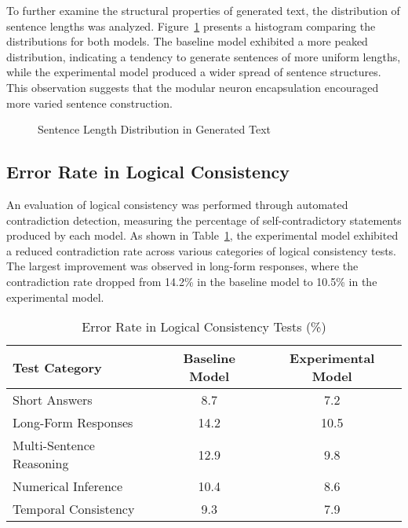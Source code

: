 \documentclass{article}
\begin{document}
To further examine the structural properties of generated text, the distribution of sentence lengths was analyzed. Figure~\ref{fig:sentence_length} presents a histogram comparing the distributions for both models. The baseline model exhibited a more peaked distribution, indicating a tendency to generate sentences of more uniform lengths, while the experimental model produced a wider spread of sentence structures. This observation suggests that the modular neuron encapsulation encouraged more varied sentence construction.

\begin{figure}[h]
	\centering
	\caption{Sentence Length Distribution in Generated Text}
	\label{fig:sentence_length}
\end{figure}

\subsection{Error Rate in Logical Consistency}

An evaluation of logical consistency was performed through automated contradiction detection, measuring the percentage of self-contradictory statements produced by each model. As shown in Table~\ref{tab:logical_errors}, the experimental model exhibited a reduced contradiction rate across various categories of logical consistency tests. The largest improvement was observed in long-form responses, where the contradiction rate dropped from 14.2\% in the baseline model to 10.5\% in the experimental model.

\begin{table}[h]
	\centering
	\caption{Error Rate in Logical Consistency Tests (\%)}
	\label{tab:logical_errors}
		\begin{tabular}{|l|c|c|}
			\hline
			\textbf{Test Category} & \textbf{Baseline Model} & \textbf{Experimental Model} \\
			\hline
			Short Answers & 8.7 & 7.2 \\
			Long-Form Responses & 14.2 & 10.5 \\
			Multi-Sentence Reasoning & 12.9 & 9.8 \\
			Numerical Inference & 10.4 & 8.6 \\
			Temporal Consistency & 9.3 & 7.9 \\
			\hline
		\end{tabular}
\end{table}
\end{document}
